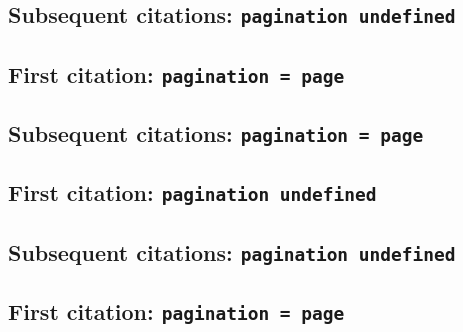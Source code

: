 \documentclass[a4paper]{article}
\begin{document}
\citereset
\cite[577]{doomedprince}

\citereset
\cite[note]{doomedprince}

\subsection{Subsequent citations: \texttt{pagination undefined}}

\cite{doomedprince}

\cite[577]{doomedprince}

\cite[note]{doomedprince}

\subsection{First citation: \texttt{pagination = page}}

\cite{doomedprince:a}

\citereset
\cite[200]{doomedprince:a}

\citereset
\cite[note]{doomedprince:a}

\subsection{Subsequent citations: \texttt{pagination = page}}

\cite{doomedprince:a}

\cite[200]{doomedprince:a}

\cite[note]{doomedprince:a}

\subsection{First citation: \texttt{pagination undefined}}

\cite{ashurinscription}

\citereset
\cite[(obv.\ lines 10)143]{ashurinscription}

\citereset
\cite[(obv.\ lines 10--17)note]{ashurinscription}

\subsection{Subsequent citations: \texttt{pagination undefined}}

\cite{ashurinscription}

\cite[(obv.\ lines 10)143]{ashurinscription}

\cite[(obv.\ lines 10--17)note]{ashurinscription}

\subsection{First citation: \texttt{pagination = page}}
\end{document}
